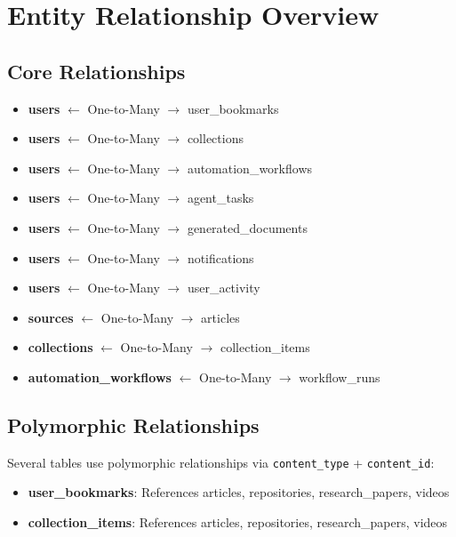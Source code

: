 \documentclass[12pt,a4paper]{report}
\begin{document}
\newpage

\chapter{Entity Relationship Overview}

\section{Core Relationships}

\begin{itemize}
    \item \textbf{users} $\leftarrow$ One-to-Many $\rightarrow$ user\_bookmarks
    \item \textbf{users} $\leftarrow$ One-to-Many $\rightarrow$ collections
    \item \textbf{users} $\leftarrow$ One-to-Many $\rightarrow$ automation\_workflows
    \item \textbf{users} $\leftarrow$ One-to-Many $\rightarrow$ agent\_tasks
    \item \textbf{users} $\leftarrow$ One-to-Many $\rightarrow$ generated\_documents
    \item \textbf{users} $\leftarrow$ One-to-Many $\rightarrow$ notifications
    \item \textbf{users} $\leftarrow$ One-to-Many $\rightarrow$ user\_activity
    \item \textbf{sources} $\leftarrow$ One-to-Many $\rightarrow$ articles
    \item \textbf{collections} $\leftarrow$ One-to-Many $\rightarrow$ collection\_items
    \item \textbf{automation\_workflows} $\leftarrow$ One-to-Many $\rightarrow$ workflow\_runs
\end{itemize}

\section{Polymorphic Relationships}

Several tables use polymorphic relationships via \texttt{content\_type} + \texttt{content\_id}:

\begin{itemize}
    \item \textbf{user\_bookmarks}: References articles, repositories, research\_papers, videos
    \item \textbf{collection\_items}: References articles, repositories, research\_papers, videos
\end{itemize}
\end{document}
